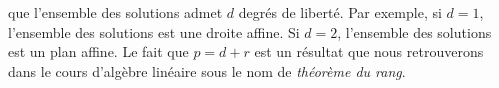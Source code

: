 \documentclass{magnolia}
\begin{document}
\begin{remarques}
  que l'ensemble des solutions admet $d$ degrés de liberté. Par exemple,
  si $d=1$, l'ensemble des solutions est une droite affine. Si $d=2$, l'ensemble des
  solutions est un plan affine. Le fait que $p=d+r$ est un résultat que nous
  retrouverons dans le cours d'algèbre linéaire sous le nom de \emph{théorème du rang}.
\end{remarques}
\end{document}
